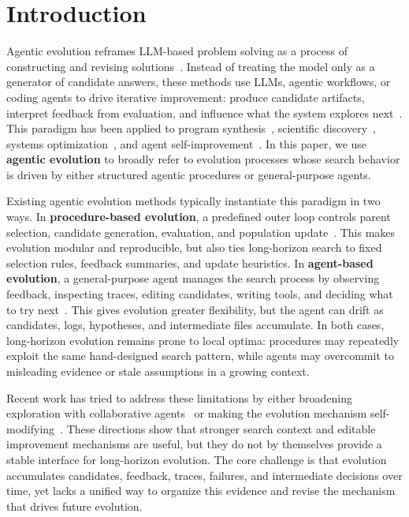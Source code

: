 \section{Introduction}
\label{sec:introduction}

Agentic evolution reframes LLM-based problem solving as a process of constructing and revising solutions~\citep{liu2025advances, gao2025evolvesurvey}. 
Instead of treating the model only as a generator of candidate answers, these methods use LLMs, agentic workflows, or coding agents to drive iterative improvement: produce candidate artifacts, interpret feedback from evaluation, and influence what the system explores next~\citep{qu2026coral}. 
This paradigm has been applied to program synthesis~\citep{jimenez2023swe}, scientific discovery~\citep{lu2024ai, yuksekgonul2026learning}, systems optimization~\citep{tbench_2025, deng2025interactcomp}, and agent self-improvement~\citep{zhang2026hyperagents, wang2025huxley, ruan2026aorchestra}. 
In this paper, we use \textbf{agentic evolution} to broadly refer to evolution processes whose search behavior is driven by either structured agentic procedures or general-purpose agents.

Existing agentic evolution methods typically instantiate this paradigm in two ways.
In \textbf{procedure-based evolution}, a predefined outer loop controls parent selection, candidate generation, evaluation, and population update~\citep{novikov2025alphaevolve, ye2026evaluation, zhang2024aflow}.
This makes evolution modular and reproducible, but also ties long-horizon search to fixed selection rules, feedback summaries, and update heuristics.
In \textbf{agent-based evolution}, a general-purpose agent manages the search process by observing feedback, inspecting traces, editing candidates, writing tools, and deciding what to try next~\citep{karpathy2026autoresearch, qu2026coral}.
This gives evolution greater flexibility, but the agent can drift as candidates, logs, hypotheses, and intermediate files accumulate.
In both cases, long-horizon evolution remains prone to local optima: procedures may repeatedly exploit the same hand-designed search pattern, while agents may overcommit to misleading evidence or stale assumptions in a growing context.


Recent work has tried to address these limitations by either broadening exploration with collaborative agents~\citep{qu2026coral} or making the evolution mechanism self-modifying~\citep{zhang2026hyperagents}.
These directions show that stronger search context and editable improvement mechanisms are useful, but they do not by themselves provide a stable interface for long-horizon evolution.
The core challenge is that evolution accumulates candidates, feedback, traces, failures, and intermediate decisions over time, yet lacks a unified way to organize this evidence and revise the mechanism that drives future evolution.


